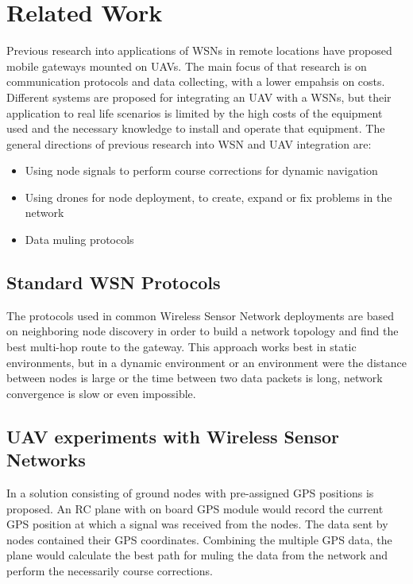 \normalfont\normalsize
\chapter{Related Work}
\label{chap:related}

Previous research into applications of WSNs in remote locations have proposed mobile gateways mounted on UAVs. The main focus of that research is on communication protocols and data collecting, with a lower empahsis on costs. Different systems are proposed for integrating an UAV with a WSNs, but their application to real life scenarios is limited by the high costs of the equipment used and the necessary knowledge to install and operate that equipment.
The general directions of previous research into WSN and UAV integration are:
\begin{itemize}

\item Using node signals to perform course corrections for dynamic navigation \cite{savarese2001location}
\item Using drones for node deployment, to create, expand or fix problems in the network \cite{akyildiz2002wireless}
\item Data muling protocols

\end{itemize}

\section{Standard WSN Protocols}

The protocols used in common Wireless Sensor Network deployments are based on neighboring node discovery in order to build a network topology and find the best multi-hop route to the gateway. This approach works best in static environments, but in a dynamic environment or an environment were the distance between nodes is large or the time between two data packets is long, network convergence is slow or even impossible.

\section{UAV experiments with Wireless Sensor Networks}

In \cite{teh2008experiments} a solution consisting of ground nodes with pre-assigned GPS positions is proposed. An RC plane with on board GPS module would record the current GPS position at which a signal was received from the nodes. The data sent by nodes contained their GPS coordinates. Combining the multiple GPS data, the plane would calculate the best path for muling the data from the network and perform the necessarily course corrections.

